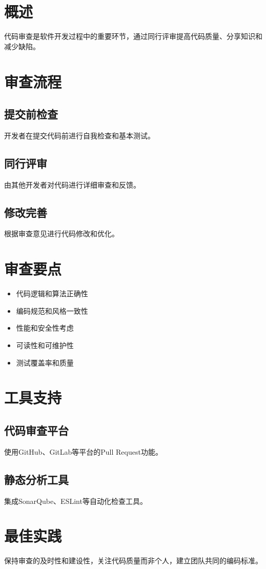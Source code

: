 \section{概述}

代码审查是软件开发过程中的重要环节，通过同行评审提高代码质量、分享知识和减少缺陷。

\section{审查流程}

\subsection{提交前检查}

开发者在提交代码前进行自我检查和基本测试。

\subsection{同行评审}

由其他开发者对代码进行详细审查和反馈。

\subsection{修改完善}

根据审查意见进行代码修改和优化。

\section{审查要点}

\begin{itemize}
\item 代码逻辑和算法正确性
\item 编码规范和风格一致性
\item 性能和安全性考虑
\item 可读性和可维护性
\item 测试覆盖率和质量
\end{itemize}

\section{工具支持}

\subsection{代码审查平台}

使用GitHub、GitLab等平台的Pull Request功能。

\subsection{静态分析工具}

集成SonarQube、ESLint等自动化检查工具。

\section{最佳实践}

保持审查的及时性和建设性，关注代码质量而非个人，建立团队共同的编码标准。